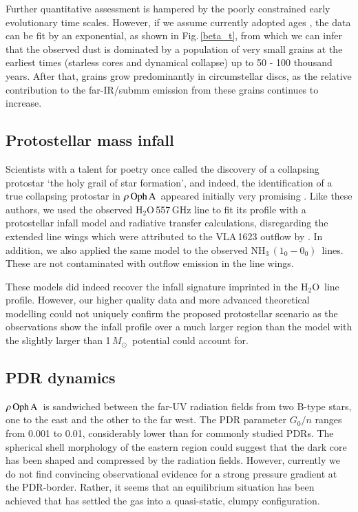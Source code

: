 \documentclass{aa}
\newcommand{\water}{H$_{2}$O}
\newcommand{\msun}{$M_{\odot}$}
\newcommand{\ettnoll}{{\rm NH}$_3\,(1_0 - 0_0)$}
\newcommand{\roa}{$\rho \, {\rm Oph \, A}$}
\begin{document}
Further quantitative assessment is hampered by the poorly constrained early evolutionary time scales. However, if we assume currently adopted ages \citep[e.g.][]{evans2009}, the data can be fit by an exponential, as shown in Fig.\,\ref{beta_t}, from which we can infer that the observed dust is dominated by a population of very small grains at the earliest times (starless cores and dynamical collapse) up to  50 - 100 thousand years. After that, grains grow predominantly in circumstellar discs, as the relative contribution to the far-IR/submm emission from these grains continues to increase.  

\subsection{Protostellar mass infall}

Scientists with a talent for poetry once called the discovery of a collapsing protostar `the holy grail of star formation', and indeed, the identification of a true collapsing protostar in \roa\ appeared initially very promising \citep{ashby2000}. Like these authors, we used the observed \water\,557\,GHz line to fit its profile with a protostellar infall model and radiative transfer calculations, disregarding the extended line wings which were attributed to the VLA\,1623 outflow by \citet{ashby2000}.  In addition, we also applied the same model to the observed \ettnoll\ lines. These are not contaminated with outflow emission in the line wings. 

These models did indeed recover the infall signature imprinted in the \water\ line profile. However, our higher quality data and more advanced theoretical modelling could not uniquely confirm the proposed protostellar scenario as the observations show the infall profile over a much larger region than  the model with the slightly larger than 1\,\msun\ potential could account for.

\subsection{ PDR dynamics}

\roa\ is sandwiched  between the far-UV radiation fields from two B-type stars, one to the east and the other to the far west. The PDR parameter $G_0/n$ ranges from  0.001 to 0.01, considerably lower than for commonly studied PDRs. 
The spherical shell morphology of the eastern region could suggest that the dark core has been shaped and compressed by the radiation fields. However, currently we do not find convincing observational evidence for a strong pressure gradient at the PDR-border. Rather, it seems that an equilibrium situation has been achieved that has settled the gas into a quasi-static, clumpy configuration. 
\end{document}
